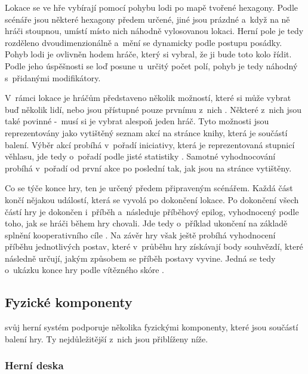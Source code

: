 Lokace se ve hře vybírají pomocí pohybu lodi po mapě tvořené hexagony. Podle scénáře jsou některé hexagony předem určené, jiné jsou prázdné a~když na ně hráči stoupnou, umístí místo nich náhodně vylosovanou lokaci. Herní pole je tedy rozděleno dvoudimenzionálně a~mění se dynamicky  podle postupu posádky. Pohyb lodi je ovlivněn hodem hráče, který si vybral, že ji bude toto kolo řídit. Podle jeho úspěšnosti se loď posune u~určitý počet polí, pohyb je tedy náhodný  s~přidanými modifikátory.

V~rámci lokace je hráčům představeno několik možností, které si může vybrat buď několik lidí, nebo jsou přístupné pouze prvnímu z~nich . Některé z~nich jsou také povinné -~musí si je vybrat alespoň jeden hráč. Tyto možnosti jsou reprezentovány jako vytištěný seznam akcí na stránce knihy, která je součástí balení. Výběr akcí probíhá v~pořadí iniciativy, která je reprezentovaná stupnicí věhlasu, jde tedy o~pořadí podle jisté statistiky . Samotné vyhodnocování probíhá v~pořadí od první akce po poslední tak, jak jsou na stránce vytištěny.

Co se týče konce hry, ten je určený předem připraveným scénářem. Každá část končí nějakou událostí, která se vyvolá po dokončení lokace. Po dokončení všech částí hry je dokončen i~příběh a~následuje příběhový epilog, vyhodnocený podle toho, jak se hráči během hry chovali. Jde tedy o~příklad ukončení na základě splnění kooperativního cíle . Na závěr hry však ještě probíhá vyhodnocení příběhu jednotlivých postav, které v~průběhu hry získávají body souhvězdí, které následně určují, jakým způsobem se příběh postavy vyvine. Jedná se tedy o~ukázku konce hry podle vítězného skóre .


\subsection{Fyzické komponenty}
\label{subsec:fw_components}

 svůj herní systém podporuje několika fyzickými komponenty, které jsou součástí balení hry. Ty nejdůležitější z~nich jsou přiblíženy níže.

\subsubsection*{Herní deska}
\label{subsubsec:fw_comp_board_and_book}

